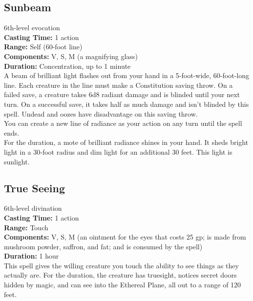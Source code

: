 \documentclass[11pt, A4paper, english]{article}
\begin{document}
		\subsection{Sunbeam}
6th-level evocation \\
\textbf{Casting Time:} 1 action \\
\textbf{Range:} Self (60-foot line) \\
\textbf{Components:} V, S, M (a magnifying glass) \\
\textbf{Duration:} Concentration, up to 1 minute \\
A beam of brilliant light flashes out from your hand in a 5-foot-wide, 60-foot-long line. Each creature in the line must make a Constitution saving throw. On a failed save, a creature takes 6d8 radiant damage and is blinded until your next turn. On a successful save, it takes half as much damage and isn't blinded by this spell. Undead and oozes have disadvantage on this saving throw. \\
You can create a new line of radiance as your action on any turn until the spell ends. \\
For the duration, a mote of brilliant radiance shines in your hand. It sheds bright light in a 30-foot radius and dim light for an additional 30 feet. This light is sunlight.

		\subsection{True Seeing}
6th-level divination \\
\textbf{Casting Time:} 1 action \\
\textbf{Range:} Touch \\
\textbf{Components:} V, S, M (an ointment for the eyes that costs 25 gp; is made from mushroom powder, saffron, and fat; and is consumed by the spell) \\
\textbf{Duration:} 1 hour \\
This spell gives the willing creature you touch the ability to see things as they actually are. For the duration, the creature has truesight, notices secret doors hidden by magic, and can see into the Ethereal Plane, all out to a range of 120 feet.
\end{document}
